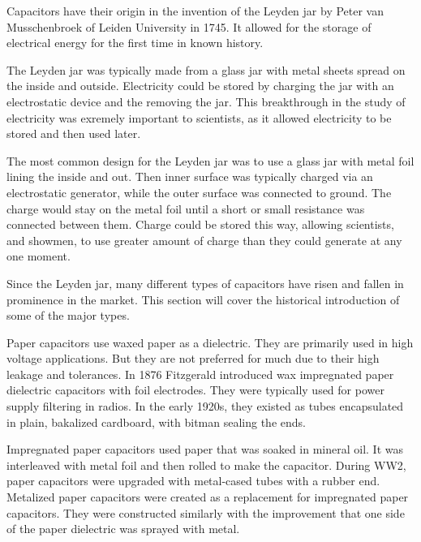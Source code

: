 \noindent Capacitors have their origin in the invention of the Leyden jar by Peter van Musschenbroek of Leiden University in 1745. \cite{empLight} It allowed for the storage of electrical energy for the first time in known history. 

\noindent The Leyden jar was typically made from a glass jar with metal sheets spread on the inside and outside. Electricity could be stored by charging the jar with an electrostatic device and the removing the jar. This breakthrough in the study of electricity was exremely important to scientists, as it allowed electricity to be stored and then used later.
\cite{ieee_hist} 

\noindent The most common design for the Leyden jar was to use a glass jar with metal foil lining the inside and out. Then inner surface was typically charged via an electrostatic generator, while the outer surface was connected to ground. The charge would stay on the metal foil until a short or small resistance was connected between them. Charge could be stored this way, allowing scientists, and showmen, to use greater amount of charge than they could generate at any one moment.

\noindent Since the Leyden jar, many different types of capacitors have risen and fallen in prominence in the market. This section will cover the historical introduction of some of the major types.

\noindent Paper capacitors use waxed paper as a dielectric. They are primarily used in high voltage applications. But they are not preferred for much due to their high leakage and tolerances.\cite{learn_caps} In 1876 Fitzgerald introduced wax impregnated paper dielectric capacitors with foil electrodes.\cite[ch.~11]{dumInv} \cite{learn_caps} They were typically used for power supply filtering in radios. In the early 1920s, they existed as tubes encapsulated in plain, bakalized cardboard, with bitman sealing the ends.\cite[ch~3]{dumInv}

\noindent Impregnated paper capacitors used paper that was soaked in mineral oil. It was interleaved with metal foil and then rolled to make the capacitor.\cite[ch.~8.2.1.1]{poorIntro} \noindent During WW2, paper capacitors were upgraded with metal-cased tubes with a rubber end.\cite[ch.~8.1]{poorIntro} Metalized paper capacitors were created as a replacement for impregnated paper capacitors. They were constructed similarly with the improvement that one side of the paper dielectric was sprayed with metal.\cite{hist_cerFilt}

